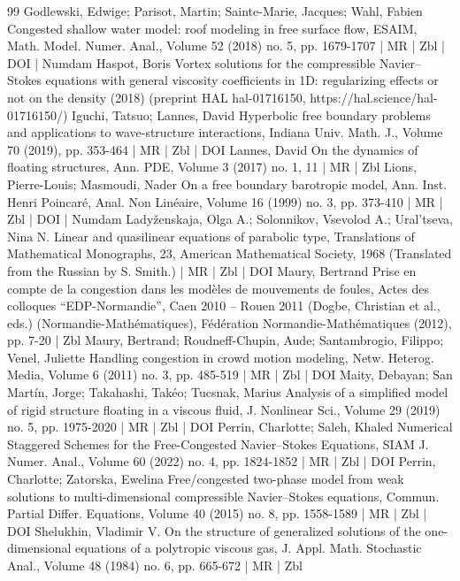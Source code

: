 \documentclass[10pt]{amsart}
\theoremstyle{definition}\newtheorem{defi}[theo]{Definition}\newtheorem{rema}[theo]{Remark}\newtheorem{exam}[theo]{Example}\newtheorem{exem}[theo]{Example}\newtheorem{nota}[theo]{Notation}
\begin{document}
\begin{thebibliography}{99}
 Godlewski, Edwige; Parisot, Martin; Sainte-Marie, Jacques; Wahl, Fabien Congested shallow water model: roof modeling in free surface flow, ESAIM, Math. Model. Numer. Anal., Volume 52 (2018) no. 5, pp. 1679-1707 | MR | Zbl | DOI | Numdam
 Haspot, Boris Vortex solutions for the compressible Navier–Stokes equations with general viscosity coefficients in 1D: regularizing effects or not on the density (2018) (preprint HAL hal-01716150, https://hal.science/hal-01716150/)
 Iguchi, Tatsuo; Lannes, David Hyperbolic free boundary problems and applications to wave-structure interactions, Indiana Univ. Math. J., Volume 70 (2019), pp. 353-464 | MR | Zbl | DOI
 Lannes, David On the dynamics of floating structures, Ann. PDE, Volume 3 (2017) no. 1, 11 | MR | Zbl
 Lions, Pierre-Louis; Masmoudi, Nader On a free boundary barotropic model, Ann. Inst. Henri Poincaré, Anal. Non Linéaire, Volume 16 (1999) no. 3, pp. 373-410 | MR | Zbl | DOI | Numdam
 Ladyženskaja, Olga A.; Solonnikov, Vsevolod A.; Ural’tseva, Nina N. Linear and quasilinear equations of parabolic type, Translations of Mathematical Monographs, 23, American Mathematical Society, 1968 (Translated from the Russian by S. Smith.) | MR | Zbl | DOI
 Maury, Bertrand Prise en compte de la congestion dans les modèles de mouvements de foules, Actes des colloques “EDP-Normandie”, Caen 2010 – Rouen 2011 (Dogbe, Christian et al., eds.) (Normandie-Mathématiques), Fédération Normandie-Mathématiques (2012), pp. 7-20 | Zbl
 Maury, Bertrand; Roudneff-Chupin, Aude; Santambrogio, Filippo; Venel, Juliette Handling congestion in crowd motion modeling, Netw. Heterog. Media, Volume 6 (2011) no. 3, pp. 485-519 | MR | Zbl | DOI
 Maity, Debayan; San Martín, Jorge; Takahashi, Takéo; Tucsnak, Marius Analysis of a simplified model of rigid structure floating in a viscous fluid, J. Nonlinear Sci., Volume 29 (2019) no. 5, pp. 1975-2020 | MR | Zbl | DOI
 Perrin, Charlotte; Saleh, Khaled Numerical Staggered Schemes for the Free-Congested Navier–Stokes Equations, SIAM J. Numer. Anal., Volume 60 (2022) no. 4, pp. 1824-1852 | MR | Zbl | DOI
 Perrin, Charlotte; Zatorska, Ewelina Free/congested two-phase model from weak solutions to multi-dimensional compressible Navier–Stokes equations, Commun. Partial Differ. Equations, Volume 40 (2015) no. 8, pp. 1558-1589 | MR | Zbl | DOI
 Shelukhin, Vladimir V. On the structure of generalized solutions of the one-dimensional equations of a polytropic viscous gas, J. Appl. Math. Stochastic Anal., Volume 48 (1984) no. 6, pp. 665-672 | MR | Zbl

\end{thebibliography}
\end{document}
